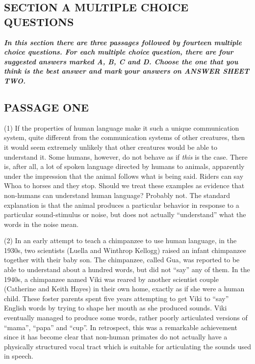 \documentclass[UTF8,11pt]{ctexart}
\begin{document}
\subsection*{\textbf{SECTION A MULTIPLE CHOICE QUESTIONS}}


\textbf{\textit{In this section there are three passages followed by fourteen multiple choice questions. For each multiple choice}} \textbf{\textit{question, there are four suggested answers marked A, B, C and D. Choose the one that you think is the best answer and mark}} \textbf{\textit{your answers on ANSWER SHEET TWO.}}


\subsection*{\textbf{PASSAGE ONE}}


(1) If the properties of human language make it such a unique communication system, quite different from the communication systems of other creatures, then it would seem extremely unlikely that other creatures would be able to understand it. Some humans, however, do not behave as if \textit{this} is the case. There is, after all, a lot of spoken language directed by humans to animals, apparently under the impression that the animal follows what is being said. Riders can say Whoa to horses and they stop. Should we treat these examples as evidence that non-humans can understand human language? Probably not. The standard explanation is that the animal produces a particular behavior in response to a particular sound-stimulus or noise, but does not actually “understand” what the words in the noise mean.


(2) In an early attempt to teach a chimpanzee to use human language, in the 1930s, two scientists (Luella and Winthrop Kellogg) raised an infant chimpanzee together with their baby son. The chimpanzee, called Gua, was reported to be able to understand about a hundred words, but did not “say” any of them. In the 1940s, a chimpanzee named Viki was reared by another scientist couple (Catherine and Keith Hayes) in their own home, exactly as if she were a human child. These foster parents spent five years attempting to get Viki to “say” English words by trying to shape her mouth as she produced sounds. Viki eventually managed to produce some words, rather poorly articulated versions of “mama”, “papa” and “cup”. In retrospect, this was a remarkable achievement since it has become clear that non-human primates do not actually have a physically structured vocal tract which is suitable for articulating the sounds used in speech.
\end{document}
